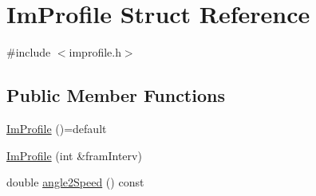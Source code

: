 \hypertarget{struct_im_profile}{}\section{Im\+Profile Struct Reference}
\label{struct_im_profile}


{\ttfamily \#include $<$improfile.\+h$>$}

\subsection*{Public Member Functions}
\begin{DoxyCompactItemize}
\item 
\mbox{\hyperlink{struct_im_profile_a2557df4a7094639b2e0abc12e1205d80}{Im\+Profile}} ()=default
\item 
\mbox{\hyperlink{struct_im_profile_a010f3183ee92250e952eefc53de47a62}{Im\+Profile}} (int \&fram\+Interv)
\item 
double \mbox{\hyperlink{struct_im_profile_ad0a4f628ebbb926cfa212941fae8d332}{angle2\+Speed}} () const
\end{DoxyCompactItemize}
